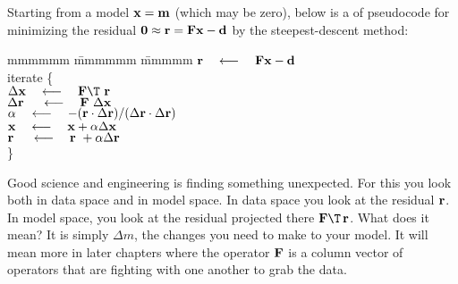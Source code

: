 \par
Starting from a model $\bold x = \bold m$ (which may be zero),
below is a  of pseudocode for minimizing the residual
$\bold 0\approx \bold r = \bold F \bold x - \bold d$
by the steepest-descent method:
\label{lsq/'sdtemplate'}
\begin{tabbing}
mmmmmm \= mmmmmm \= mmmmm \kill
\> $\bold r \quad\longleftarrow\quad \bold F \bold x - \bold d$ \\
\> {\rm iterate \{ }                                                    \\
\>      \>  $\Delta \bold x   \padarrow \bold F\T\         \bold r$      \\
\>      \>  $\Delta \bold r\  \quad\longleftarrow\quad \bold F \  \Delta \bold x$      \\
\>      \> $\alpha \quad\longleftarrow\quad
                -(       \bold r \cdot \Delta\bold r )/
                 (\Delta \bold r \cdot \Delta\bold r )
                $
                \\
\>      \> $\bold x   \quad\longleftarrow\quad \bold x   + \alpha\Delta \bold x$       \\
\>      \> $\bold r\  \quad\longleftarrow\quad \bold r\  + \alpha\Delta \bold r$       \\
\>      \> \}                                                   
\end{tabbing}


\par
Good science and engineering is finding something unexpected.
For this you look both in data space and in model space.
In data space you look at the residual $\bold r$.
In model space, you look at the residual projected there $\bold F\T\,\bold r$.
What does it mean?
It is simply $\Delta m$,
the changes you need to make to your model.
It will mean more in later chapters
where the operator $\bold F$ is a column vector of operators
that are fighting with one another to grab the data.



